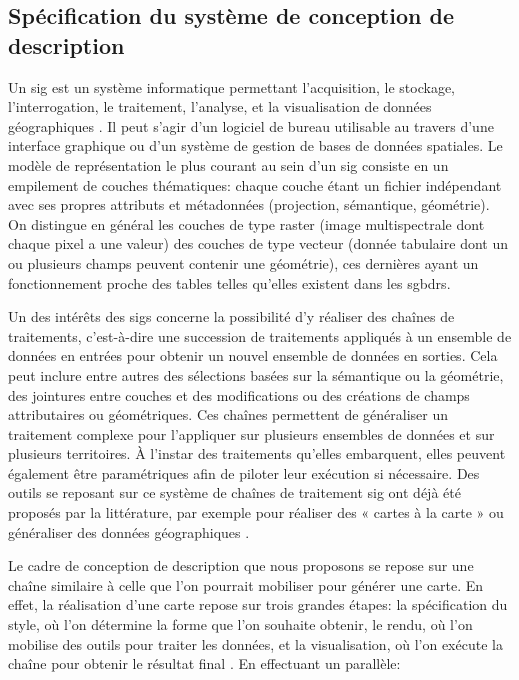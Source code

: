 \subsection{Spécification du système de conception de description}

Un \gls{sig} est un système informatique permettant l’acquisition, le stockage, l’interrogation, le traitement, l’analyse, et la visualisation de données géographiques \citep{AschanLeygonie2019}. Il peut s’agir d’un logiciel de bureau utilisable au travers d’une interface graphique ou d’un système de gestion de bases de données spatiales. Le modèle de représentation le plus courant au sein d'un \gls{sig} consiste en un empilement de couches thématiques: chaque couche étant un fichier indépendant avec ses propres attributs et métadonnées (projection, sémantique, géométrie). On distingue en général les couches de type raster (image multispectrale dont chaque pixel a une valeur) des couches de type vecteur (donnée tabulaire dont un ou plusieurs champs peuvent contenir une géométrie), ces dernières ayant un fonctionnement proche des tables telles qu’elles existent dans les \glspl{sgbdr}. 

\newpar{}

Un des intérêts des \glspl{sig} concerne la possibilité d’y réaliser des chaînes de traitements, c’est-à-dire une succession de traitements appliqués à un ensemble de données en entrées pour obtenir un nouvel ensemble de données en sorties. Cela peut inclure entre autres des sélections basées sur la sémantique ou la géométrie, des jointures entre couches et des modifications ou des créations de champs attributaires ou géométriques. Ces chaînes permettent de généraliser un traitement complexe pour l’appliquer sur plusieurs ensembles de données et sur plusieurs territoires. À l’instar des traitements qu’elles embarquent, elles peuvent également être paramétriques afin de piloter leur exécution si nécessaire. Des outils se reposant sur ce système de chaînes de traitement \gls{sig} ont déjà été proposés par la littérature, par exemple pour réaliser des « cartes à la carte » \citep{bucher2007} ou généraliser des données géographiques \citep{lee2001,petzold2006}.

\newpar{}

Le cadre de conception de description que nous proposons se repose sur une chaîne similaire à celle que l’on pourrait mobiliser pour générer une carte. En effet, la réalisation d’une carte repose sur trois grandes étapes: la spécification du style, où l’on détermine la forme que l’on souhaite obtenir, le rendu, où l’on mobilise des outils pour traiter les données, et la visualisation, où l’on exécute la chaîne pour obtenir le résultat final \cite{christophe2016}. En effectuant un parallèle:

